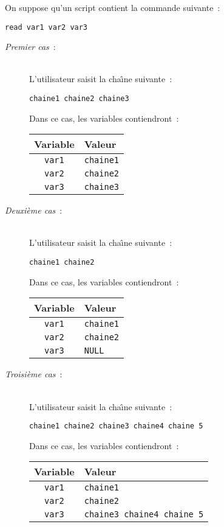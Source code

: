 \begin{example}
On suppose qu'un script contient la commande suivante~:
\begin{sloppypar}
\centering \verb=read var1 var2 var3=
\end{sloppypar}

\begin{description}
	\item[\textsl{Premier cas}~:]\mbox{}\\
		L'utilisateur saisit la cha{\^\i}ne suivante~:
		\begin{sloppypar}
		\centering \verb*=chaine1 chaine2 chaine3=
		\end{sloppypar}
		Dans ce cas, les variables contiendront~:\\[1.5ex]
		\begin{tabular}{|c|l|}
			\hline
			Variable	&	Valeur			\\
			\hline \hline
			\texttt{var1}	&	\texttt{chaine1}	\\
			\texttt{var2}	&	\texttt{chaine2}	\\
			\texttt{var3}	&	\texttt{chaine3}	\\
			\hline
		\end{tabular}
	\item[\textsl{Deuxi{\`e}me cas}~:]\mbox{}\\
		L'utilisateur saisit la cha{\^\i}ne suivante~:
		\begin{sloppypar}
		\centering \verb*=chaine1 chaine2=
		\end{sloppypar}
		Dans ce cas, les variables contiendront~:\\[1.5ex]
		\begin{tabular}{|c|l|}
			\hline
			Variable	&	Valeur			\\
			\hline \hline
			\texttt{var1}	&	\texttt{chaine1}	\\
			\texttt{var2}	&	\texttt{chaine2}	\\
			\texttt{var3}	&	\texttt{NULL}		\\
			\hline
		\end{tabular}
	\item[\textsl{Troisi{\`e}me cas}~:]\mbox{}\\
		L'utilisateur saisit la cha{\^\i}ne suivante~:
		\begin{sloppypar}
		\centering \verb*=chaine1 chaine2 chaine3 chaine4 chaine 5=
		\end{sloppypar}
		Dans ce cas, les variables contiendront~:\\[1.5ex]
		\begin{tabular}{|c|l|}
			\hline
			Variable	&	Valeur			\\
			\hline \hline
			\texttt{var1}	&	\texttt{chaine1}	\\
			\texttt{var2}	&	\texttt{chaine2}	\\
			\texttt{var3}	&	\verb*=chaine3 chaine4 chaine 5=	\\
			\hline
		\end{tabular}
\end{description}
\end{example}


